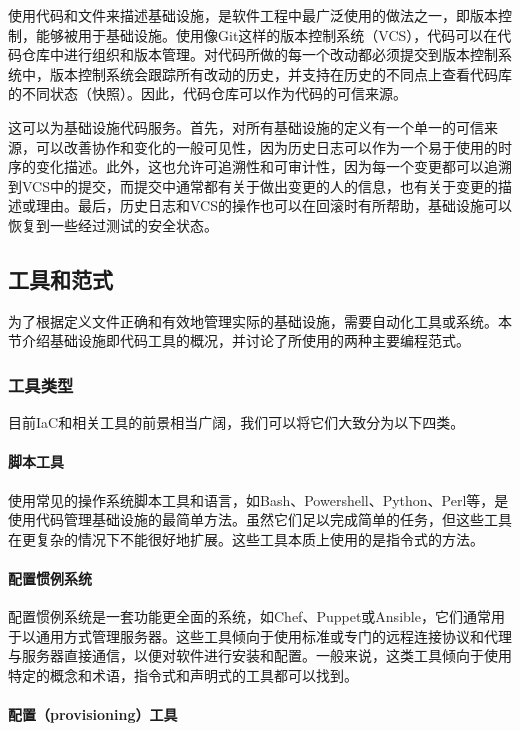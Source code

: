 \documentclass[macfonts,master]{njuthesis}
\begin{document}
使用代码和文件来描述基础设施，是软件工程中最广泛使用的做法之一，即版本控制，能够被用于基础设施。使用像Git这样的版本控制系统（VCS），代码可以在代码仓库中进行组织和版本管理。对代码所做的每一个改动都必须提交到版本控制系统中，版本控制系统会跟踪所有改动的历史，并支持在历史的不同点上查看代码库的不同状态（快照）。因此，代码仓库可以作为代码的可信来源。

这可以为基础设施代码服务。首先，对所有基础设施的定义有一个单一的可信来源，可以改善协作和变化的一般可见性，因为历史日志可以作为一个易于使用的时序的变化描述。此外，这也允许可追溯性和可审计性，因为每一个变更都可以追溯到VCS中的提交，而提交中通常都有关于做出变更的人的信息，也有关于变更的描述或理由。最后，历史日志和VCS的操作也可以在回滚时有所帮助，基础设施可以恢复到一些经过测试的安全状态。

\subsection{工具和范式}

为了根据定义文件正确和有效地管理实际的基础设施，需要自动化工具或系统。本节介绍基础设施即代码工具的概况，并讨论了所使用的两种主要编程范式。

\subsubsection{工具类型}
目前IaC和相关工具的前景相当广阔，我们可以将它们大致分为以下四类\cite{whatisiac}。

\paragraph{脚本工具}

使用常见的操作系统脚本工具和语言，如Bash、Powershell、Python、Perl等，是使用代码管理基础设施的最简单方法。虽然它们足以完成简单的任务，但这些工具在更复杂的情况下不能很好地扩展。这些工具本质上使用的是指令式的方法。

\paragraph{配置惯例系统}

配置惯例系统是一套功能更全面的系统，如Chef、Puppet或Ansible，它们通常用于以通用方式管理服务器。这些工具倾向于使用标准或专门的远程连接协议和代理与服务器直接通信，以便对软件进行安装和配置。一般来说，这类工具倾向于使用特定的概念和术语，指令式和声明式的工具都可以找到。

\paragraph{配置（provisioning）工具}
\end{document}
